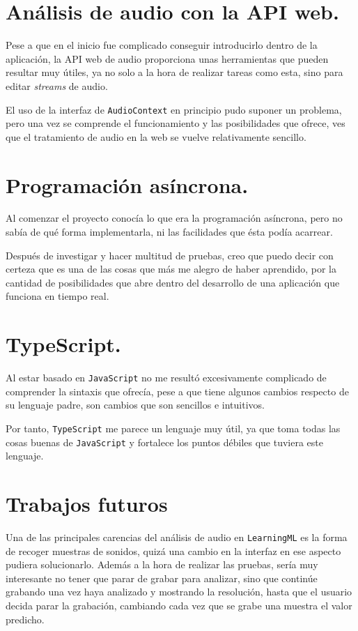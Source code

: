 \documentclass[a4paper, 12pt]{book}
\begin{document}
\section*{Análisis de audio con la API web.}

Pese a que en el inicio fue complicado conseguir introducirlo dentro de la aplicación, la API web de audio proporciona unas herramientas que pueden resultar muy útiles, ya no solo a la hora de realizar tareas como esta, sino para editar \textit{streams} de audio.

El uso de la interfaz de \texttt{AudioContext} en principio pudo suponer un problema, pero una vez se comprende el funcionamiento y las posibilidades que ofrece, ves que el tratamiento de audio en la web se vuelve relativamente sencillo.

\section*{Programación asíncrona.}

Al comenzar el proyecto conocía lo que era la programación asíncrona, pero no sabía de qué forma implementarla, ni las facilidades que ésta podía acarrear.

Después de investigar y hacer multitud de pruebas, creo que puedo decir con certeza que es una de las cosas que más me alegro de haber aprendido, por la cantidad de posibilidades que abre dentro del desarrollo de una aplicación que funciona en tiempo real.

\section*{TypeScript.}

Al estar basado en \texttt{JavaScript} no me resultó excesivamente complicado de comprender la sintaxis que ofrecía, pese a que tiene algunos cambios respecto de su lenguaje padre, son cambios que son sencillos e intuitivos.

Por tanto, \texttt{TypeScript} me parece un lenguaje muy útil, ya que toma todas las cosas buenas de \texttt{JavaScript} y fortalece los puntos débiles que tuviera este lenguaje.

\section{Trabajos futuros}
\label{sec:trabajos_futuros}

Una de las principales carencias del análisis de audio en \texttt{LearningML} es la forma de recoger muestras de sonidos, quizá una cambio en la interfaz en ese aspecto pudiera solucionarlo. Además a la hora de realizar las pruebas, sería muy interesante no tener que parar de grabar para analizar, sino que continúe grabando una vez haya analizado y mostrando la resolución, hasta que el usuario decida parar la grabación, cambiando cada vez que se grabe una muestra el valor predicho.
\end{document}
